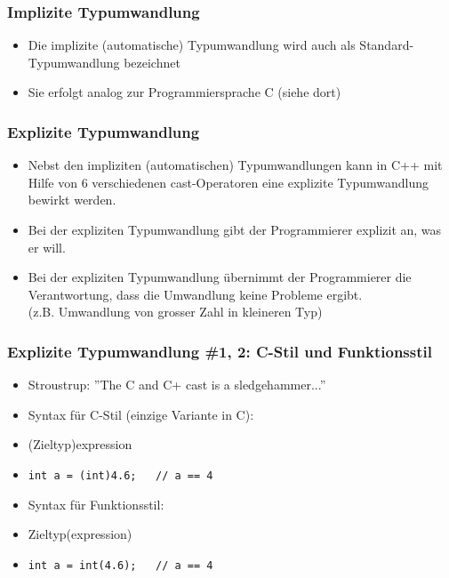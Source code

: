 \subsubsection{Implizite Typumwandlung\hfill}
\label{sec:Implizite Typumwandlung}
\begin{itemize}
	\item Die implizite (automatische) Typumwandlung wird auch als Standard-Typumwandlung bezeichnet
	\item Sie erfolgt analog zur Programmiersprache C (siehe dort)
\end{itemize}

\subsubsection{Explizite Typumwandlung\hfill}
\label{sec:Explizite Typumwandlung}
\begin{itemize}
	\item Nebst den impliziten (automatischen) Typumwandlungen kann in C++ mit Hilfe von 6 verschiedenen cast-Operatoren eine explizite Typumwandlung bewirkt werden.
	\item Bei der expliziten Typumwandlung gibt der Programmierer explizit an, was er will.
	\item[\-]
	\begin{achtung}
	Bei der expliziten Typumwandlung übernimmt der Programmierer die Verantwortung, dass die Umwandlung keine Probleme ergibt.\\
	(z.B. Umwandlung von grosser Zahl in kleineren Typ)
	\end{achtung}
\end{itemize}

\subsubsection{Explizite Typumwandlung \#1, 2: C-Stil und Funktionsstil\hfill}
\label{sec:Explizite Typumwandlung 1}
\begin{itemize}
	\item Stroustrup: ''The C and C+ cast is a sledgehammer...''
	\item Syntax für C-Stil (einzige Variante in C):
	\item[\-](Zieltyp)expression
	\item[\-]
\noindent
\begin{minipage}{\linewidth}
\begin{lstlisting}
int a = (int)4.6;	// a == 4
\end{lstlisting}
\end{minipage}
	\item Syntax für Funktionsstil:
	\item[\-] Zieltyp(expression)
	\item[\-]
\noindent
\begin{minipage}{\linewidth}
\begin{lstlisting}
int a = int(4.6);	// a == 4
\end{lstlisting}
\end{minipage}
\end{itemize}

